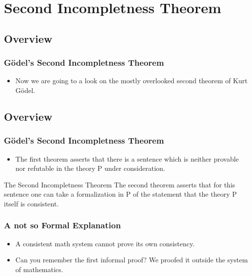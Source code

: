 \documentclass[aspectratio=169]{beamer}
\begin{document}
\section{Second Incompletness Theorem}
\subsection{Overview}
\begin{frame}
	\frametitle{Gödel's Second Incompletness Theorem}
	\begin{itemize}
		\item Now we are going to a look on the mostly overlooked second theorem of Kurt Gödel.
	\end{itemize}
\end{frame}

\subsection{Overview}
\begin{frame}
	\frametitle{Gödel's Second Incompletness Theorem}
	\begin{itemize}
		\item The first theorem asserts that there is a sentence which is neither provable nor refutable in the theory P under consideration.
	\end{itemize}
	\begin{block}{The Second Incompletness Theorem}
		The second theorem asserts that for this sentence one can take a formalization in P of the statement that the theory P itself is consistent.
	\end{block}

\end{frame}

\begin{frame}
	\frametitle{A not so Formal Explanation}
	\begin{itemize}
		\item A consistent math system cannot prove its own consistency.
		\item Can you remember the first informal proof? We proofed it outside the system of mathematics.
		\hyperlink{important}{}
	\end{itemize}
\end{frame}
\end{document}
